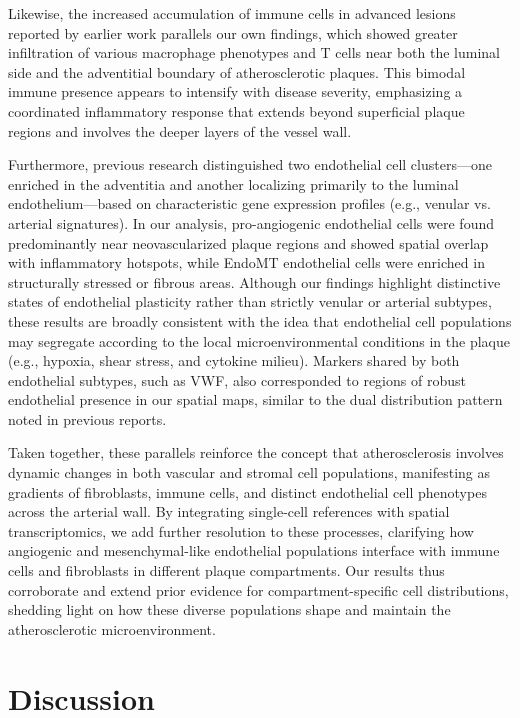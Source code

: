 \documentclass[a4paper,12pt]{article}
\begin{document}
Likewise, the increased accumulation of immune cells in advanced lesions reported by earlier work parallels our own findings, which showed greater infiltration of various macrophage phenotypes and T cells near both the luminal side and the adventitial boundary of atherosclerotic plaques. This bimodal immune presence appears to intensify with disease severity, emphasizing a coordinated inflammatory response that extends beyond superficial plaque regions and involves the deeper layers of the vessel wall.

Furthermore, previous research distinguished two endothelial cell clusters—one enriched in the adventitia and another localizing primarily to the luminal endothelium—based on characteristic gene expression profiles (e.g., venular vs. arterial signatures). In our analysis, pro-angiogenic endothelial cells were found predominantly near neovascularized plaque regions and showed spatial overlap with inflammatory hotspots, while EndoMT endothelial cells were enriched in structurally stressed or fibrous areas. Although our findings highlight distinctive states of endothelial plasticity rather than strictly venular or arterial subtypes, these results are broadly consistent with the idea that endothelial cell populations may segregate according to the local microenvironmental conditions in the plaque (e.g., hypoxia, shear stress, and cytokine milieu). Markers shared by both endothelial subtypes, such as VWF, also corresponded to regions of robust endothelial presence in our spatial maps, similar to the dual distribution pattern noted in previous reports.

Taken together, these parallels reinforce the concept that atherosclerosis involves dynamic changes in both vascular and stromal cell populations, manifesting as gradients of fibroblasts, immune cells, and distinct endothelial cell phenotypes across the arterial wall. By integrating single-cell references with spatial transcriptomics, we add further resolution to these processes, clarifying how angiogenic and mesenchymal-like endothelial populations interface with immune cells and fibroblasts in different plaque compartments. Our results thus corroborate and extend prior evidence for compartment-specific cell distributions, shedding light on how these diverse populations shape and maintain the atherosclerotic microenvironment.




\section{Discussion}
\end{document}
